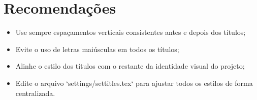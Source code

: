 \section{Recomendações}

\begin{itemize}
	\item Use sempre espaçamentos verticais consistentes antes e depois dos títulos;
	\item Evite o uso de letras maiúsculas em todos os títulos;
	\item Alinhe o estilo dos títulos com o restante da identidade visual do projeto;
	\item Edite o arquivo `settings/settitles.tex` para ajustar todos os estilos de forma centralizada.
\end{itemize}
